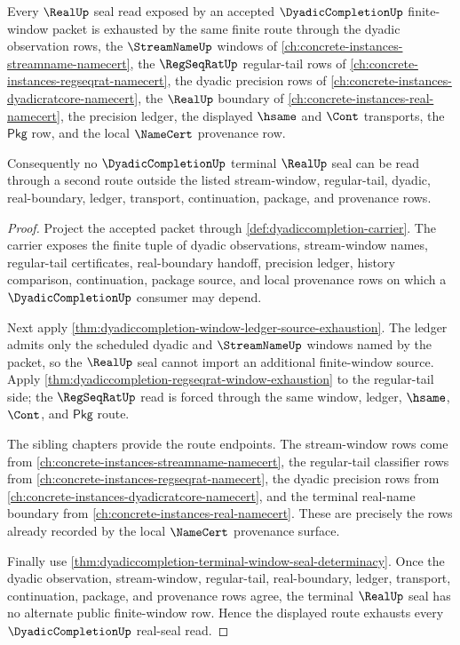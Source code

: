 \begin{theorem}\label{thm:dyadiccompletion-realup-route-exhaustion}
Every $\RealUp$ seal read exposed by an accepted $\DyadicCompletionUp$
finite-window packet is exhausted by the same finite route through the dyadic
observation rows, the $\StreamNameUp$ windows of
\autoref{ch:concrete-instances-streamname-namecert}, the $\RegSeqRatUp$
regular-tail rows of \autoref{ch:concrete-instances-regseqrat-namecert}, the
dyadic precision rows of \autoref{ch:concrete-instances-dyadicratcore-namecert},
the $\RealUp$ boundary of \autoref{ch:concrete-instances-real-namecert}, the
precision ledger, the displayed $\hsame$ and $\Cont$ transports, the
$\mathsf{Pkg}$ row, and the local $\NameCert$ provenance row.

Consequently no $\DyadicCompletionUp$ terminal $\RealUp$ seal can be read
through a second route outside the listed stream-window, regular-tail, dyadic,
real-boundary, ledger, transport, continuation, package, and provenance rows.
\end{theorem}
\begin{proof}
Project the accepted packet through \autoref{def:dyadiccompletion-carrier}.
The carrier exposes the finite tuple of dyadic observations, stream-window
names, regular-tail certificates, real-boundary handoff, precision ledger,
history comparison, continuation, package source, and local provenance rows on
which a $\DyadicCompletionUp$ consumer may depend.

Next apply \autoref{thm:dyadiccompletion-window-ledger-source-exhaustion}. The
ledger admits only the scheduled dyadic and $\StreamNameUp$ windows named by
the packet, so the $\RealUp$ seal cannot import an additional finite-window
source. Apply \autoref{thm:dyadiccompletion-regseqrat-window-exhaustion} to the
regular-tail side; the $\RegSeqRatUp$ read is forced through the same
window, ledger, $\hsame$, $\Cont$, and $\mathsf{Pkg}$ route.

The sibling chapters provide the route endpoints. The stream-window rows come
from \autoref{ch:concrete-instances-streamname-namecert}, the regular-tail
classifier rows from \autoref{ch:concrete-instances-regseqrat-namecert}, the
dyadic precision rows from \autoref{ch:concrete-instances-dyadicratcore-namecert},
and the terminal real-name boundary from
\autoref{ch:concrete-instances-real-namecert}. These are precisely the rows
already recorded by the local $\NameCert$ provenance surface.

Finally use
\autoref{thm:dyadiccompletion-terminal-window-seal-determinacy}. Once the
dyadic observation, stream-window, regular-tail, real-boundary, ledger,
transport, continuation, package, and provenance rows agree, the terminal
$\RealUp$ seal has no alternate public finite-window row. Hence the displayed
route exhausts every $\DyadicCompletionUp$ real-seal read.
\end{proof}

